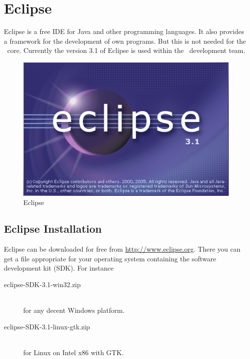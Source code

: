 \section{Eclipse}

Eclipse is a free IDE for Java and other programming languages. It
also provides a framework for the development of own programs. But
this is not needed for the \ExTeX\ core. Currently the version 3.1 of
Eclipse is used within the \ExTeX\ development team.
\begin{figure}[h]
  \centering  \includegraphics[scale=.5]{image/eclipse-splash}
  \caption{Eclipse}\label{fig:eclipse}
\end{figure}

\subsection{Eclipse Installation}

Eclipse can be downloaded for free from \url{http://www.eclipse.org}.
There you can get a file appropriate for your operating system
containing the software development kit (SDK). For instance
\begin{description}
\item [eclipse-SDK-3.1-win32.zip]\ \\
  for any decent Windows platform.
\item [eclipse-SDK-3.1-linux-gtk.zip]\ \\
  for Linux on Intel x86 with GTK.
\end{description}


